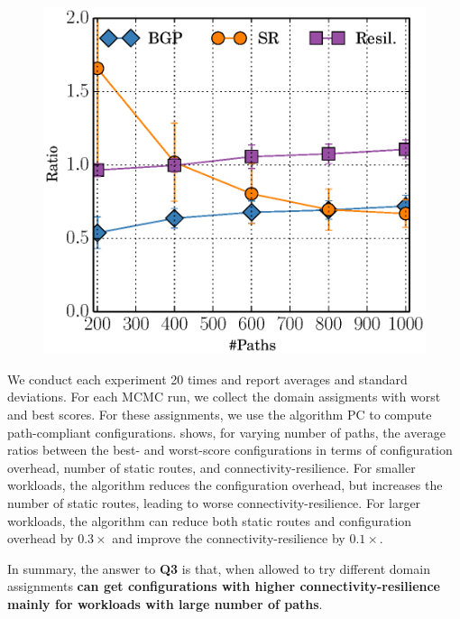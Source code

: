 \begin{figure}
\vspace{-2.5mm}
	\includegraphics[width=0.29\columnwidth]{figures/ratioMCMC.eps}
\end{figure}
We conduct each experiment 20 times and report averages and standard
deviations.  For each MCMC run, we collect the domain assigments with
worst and best scores.  For these assignments, we use the algorithm PC
to compute path-compliant configurations.
 shows, for varying number of paths, the average ratios
between the best- and worst-score configurations
in terms of
configuration overhead, number of static routes, and 
connectivity-resilience.
For smaller workloads, 
the algorithm reduces the configuration overhead, but increases
the number of static routes, leading to worse connectivity-resilience. For 
larger workloads, the algorithm can
reduce both static routes 
and configuration overhead by $0.3\times$
and improve the connectivity-resilience 
by $0.1\times$.

In summary, the answer to \textbf{Q3} is that,
when allowed to try different domain assignments
\textbf{\name can get configurations with higher connectivity-resilience mainly for workloads with large number of paths}.
